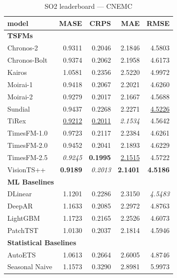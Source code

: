 \begin{table}[H]
\caption{SO2 leaderboard --- CNEMC}
\centering
\begin{small}
\begin{tabular}{lrrrr}
\toprule
model & MASE & CRPS & MAE & RMSE \\
\midrule
\multicolumn{5}{l}{\textbf{TSFMs}} \\
Chronos-2 & 0.9311 & 0.2046 & 2.1846 & 4.5803 \\
Chronos-Bolt & 0.9374 & 0.2062 & 2.1958 & 4.6173 \\
Kairos & 1.0581 & 0.2356 & 2.5220 & 4.9972 \\
Moirai-1 & 0.9418 & 0.2067 & 2.2021 & 4.6260 \\
Moirai-2 & 0.9279 & 0.2017 & 2.1667 & 4.5688 \\
Sundial & 0.9437 & 0.2268 & 2.2271 & \underline{4.5226} \\
TiRex & \underline{0.9212} & \underline{0.2011} & \textit{2.1534} & 4.5642 \\
TimesFM-1.0 & 0.9723 & 0.2117 & 2.2384 & 4.6261 \\
TimesFM-2.0 & 0.9452 & 0.2041 & 2.1893 & 4.6229 \\
TimesFM-2.5 & \textit{0.9245} & \textbf{0.1995} & \underline{2.1515} & 4.5722 \\
VisionTS++ & \textbf{0.9189} & \textit{0.2013} & \textbf{2.1401} & \textbf{4.5186} \\
\midrule
\multicolumn{5}{l}{\textbf{ML Baselines}} \\
DLinear & 1.1201 & 0.2286 & 2.3150 & \textit{4.5483} \\
DeepAR & 1.1633 & 0.2085 & 2.2972 & 4.8763 \\
LightGBM & 1.1723 & 0.2165 & 2.2526 & 4.6073 \\
PatchTST & 1.0130 & 0.2037 & 2.1814 & 4.5946 \\
\midrule
\multicolumn{5}{l}{\textbf{Statistical Baselines}} \\
AutoETS & 1.0613 & 0.2664 & 2.6005 & 4.8746 \\
Seasonal Naive & 1.1573 & 0.3290 & 2.8981 & 5.9973 \\
\bottomrule
\end{tabular}
\end{small}
\end{table}